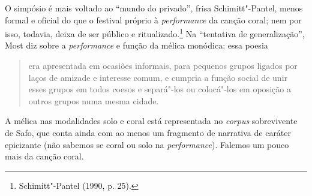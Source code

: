 O simpósio é mais voltado ao “mundo do privado”, frisa Schimitt"-Pantel, menos
formal e oficial do que o festival próprio à \textit{performance}
da canção coral; nem por isso, todavia, deixa de ser público e
ritualizado.\footnote{ Schimitt"-Pantel (1990, p. 25).} Na
“tentativa de generalização”, Most diz sobre a \textit{performance} e função da
mélica monódica: essa poesia 

\begin{quote}
era apresentada em ocasiões informais, para
pequenos grupos ligados por laços de amizade e interesse comum, e cumpria a
função social de unir esses grupos em todos coesos e separá"-los ou colocá"-los
em oposição a outros grupos numa mesma cidade.
\end{quote}

A mélica nas modalidades solo e coral está representada no \textit{corpus} sobrevivente
de Safo, que conta ainda com ao menos um fragmento de narrativa de
caráter epicizante (não sabemos se coral ou solo na \textit{performance}).
Falemos um pouco mais da canção coral.

